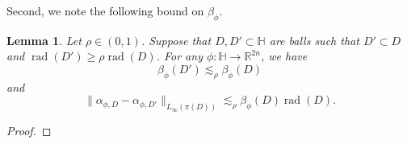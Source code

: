 \documentclass[12pt,reqno]{amsart}
\DeclareMathOperator{\rad}{rad}
\newcommand{\HH}{\mathbb{H}}
\newcommand{\R}{\mathbb{R}}
\newcommand{\from}{\colon}
\newtheorem{lemma}[thm]{Lemma}
\theoremstyle{remark}
\newcommand{\0}{\mathbf{0}}
\renewcommand{\1}{\mathbf 1}
\begin{document}
Second, we note the following bound on $\beta_\phi$.
\begin{lemma}\label{lem:beta-compare}
  Let $\rho \in (0,1)$. Suppose that $D, D'\subset \HH$ are balls such that $D'\subset D$ and $\rad(D') \ge \rho \rad(D)$. For any $\phi\from \HH \to \R^{2n}$, we have
  \begin{equation}\label{eqn:CompareBeta}
  \beta_\phi(D') \lesssim_\rho \beta_\phi(D)
  \end{equation}
  and
  \begin{equation}\label{eqn:CompareAlphaPhiB}
  \|\alpha_{\phi,D} - \alpha_{\phi, D'}\|_{L_\infty(\pi(D))} \lesssim_\rho \beta_\phi(D) \rad(D).
  \end{equation}
\end{lemma}
\begin{proof}


\end{proof}
\end{document}
